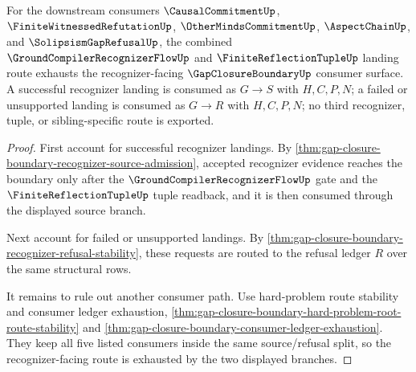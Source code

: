 \begin{theorem}
\label{thm:gap-closure-boundary-recognizer-consumer-exhaustion}
For the downstream consumers $\CausalCommitmentUp$, $\FiniteWitnessedRefutationUp$, $\OtherMindsCommitmentUp$, $\AspectChainUp$, and $\SolipsismGapRefusalUp$, the combined $\GroundCompilerRecognizerFlowUp$ and $\FiniteReflectionTupleUp$ landing route exhausts the recognizer-facing $\GapClosureBoundaryUp$ consumer surface. A successful recognizer landing is consumed as $G \longrightarrow S$ with $H,C,P,N$; a failed or unsupported landing is consumed as $G \longrightarrow R$ with $H,C,P,N$; no third recognizer, tuple, or sibling-specific route is exported.
\end{theorem}
\begin{proof}
First account for successful recognizer landings. By \autoref{thm:gap-closure-boundary-recognizer-source-admission}, accepted recognizer evidence reaches the boundary only after the $\GroundCompilerRecognizerFlowUp$ gate and the $\FiniteReflectionTupleUp$ tuple readback, and it is then consumed through the displayed source branch.

Next account for failed or unsupported landings. By \autoref{thm:gap-closure-boundary-recognizer-refusal-stability}, these requests are routed to the refusal ledger $R$ over the same structural rows.

It remains to rule out another consumer path. Use hard-problem route stability and consumer ledger exhaustion, \autoref{thm:gap-closure-boundary-hard-problem-root-route-stability} and \autoref{thm:gap-closure-boundary-consumer-ledger-exhaustion}. They keep all five listed consumers inside the same source/refusal split, so the recognizer-facing route is exhausted by the two displayed branches.
\end{proof}
